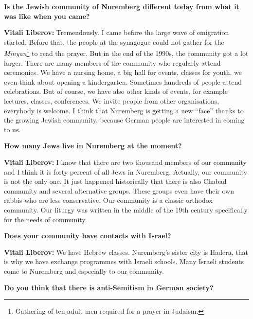 \textbf{Is the Jewish community of Nuremberg different today from what it was like when you came?} 

\textbf{Vitali Liberov:} Tremendously. I came before the large wave of emigration started. Before that, the people at the synagogue could not gather for the \textit{Minyan}\footnote{Gathering of ten adult men required for a prayer in Judaism.} to read the prayer. But in the end of the 1990s, the community got a lot larger. There are many members of the community who regularly attend ceremonies. We have a nursing home, a big hall for events, classes for youth, we even think about opening a kindergarten. Sometimes hundreds of people attend celebrations.  But of course, we have also other kinds of events, for example lectures, classes, conferences. We invite people from other organisations, everybody is welcome. I think that Nuremberg is getting a new ``face'' thanks to the growing Jewish community, because German people are interested in coming to us.    

\textbf{How many Jews live in Nuremberg at the moment?} 

\textbf{Vitali Liberov:} I know that there are two thousand members of our community and I think it is forty percent of all Jews in Nuremberg. Actually, our community is not the only one. It just happened historically that there is also Chabad community and several alternative groups. These groups even have their own rabbis who are less conservative. Our community is a classic orthodox community. 
Our liturgy was written in the middle of the 19th century specifically for the needs of community.   

\textbf{Does your community have contacts with Israel?} 

\textbf{Vitali Liberov:} We have Hebrew classes. Nuremberg’s sister city is Hadera, that is why we have exchange programmes with Israeli schools. Many Israeli students come to Nuremberg and especially to our community. 

\textbf{Do you think that there is anti-Semitism in German society?} 

